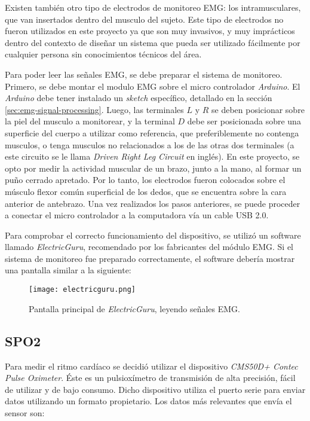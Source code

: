 Existen también otro tipo de electrodos de monitoreo EMG: los intramusculares, que van insertados dentro del musculo del sujeto. Este tipo de electrodos no fueron utilizados en este proyecto ya que son muy invasivos, y muy imprácticos dentro del contexto de diseñar un sistema que pueda ser utilizado fácilmente por cualquier persona sin conocimientos técnicos del área.

Para poder leer las señales EMG, se debe preparar el sistema de monitoreo.  Primero, se debe montar el modulo EMG sobre el micro controlador \emph{Arduino}.  El \emph{Arduino} debe tener instalado un \emph{sketch} específico, detallado en la sección \ref{sec:emg-signal-processing}. Luego, las terminales $L$ y $R$ se deben posicionar sobre la piel del musculo a monitorear, y la terminal $D$ debe ser posicionada sobre una superficie del cuerpo a utilizar como referencia, que preferiblemente no contenga musculos, o tenga musculos no relacionados a los de las otras dos terminales (a este circuito se le llama \emph{Driven Right Leg Circuit} en inglés). En este proyecto, se opto por medir la actividad muscular de un brazo, junto a la mano, al formar un puño cerrado apretado. Por lo tanto, los electrodos fueron colocados sobre el músculo flexor común superficial de los dedos, que se encuentra sobre la cara anterior de antebrazo\cite{emg-signals-wrist}. Una vez realizados los pasos anteriores, se puede proceder a conectar el micro controlador a la computadora vía un cable USB 2.0.

Para comprobar el correcto funcionamiento del dispositivo, se utilizó un software llamado \emph{ElectricGuru}, recomendado por los fabricantes del módulo EMG. Si el sistema de monitoreo fue preparado correctamente, el software debería mostrar una pantalla similar a la siguiente:

\begin{figure}[H]
	\centering
    \texttt{[image: electricguru.png]}
    \caption{Pantalla principal de \emph{ElectricGuru}, leyendo señales EMG.}
	\label{fig:emg-electricguru}
\end{figure}

\subsection{SPO2}

Para medir el ritmo cardíaco se decidió utilizar el dispositivo \emph{CMS50D+ Contec Pulse Oximeter}. Éste es un pulsioxímetro de transmisión de alta precisión, fácil de utilizar y de bajo consumo. Dicho dispositivo utiliza el puerto serie para enviar datos utilizando un formato propietario. Los datos más relevantes que envía el sensor son:

